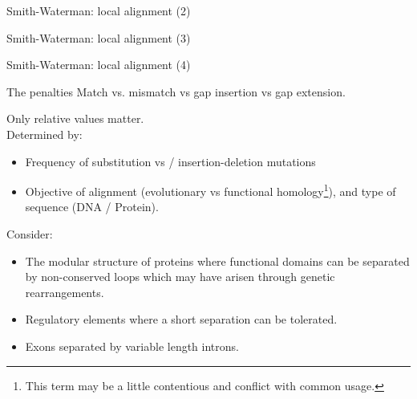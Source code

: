 \documentclass[pdf]{beamer}
\begin{document}
\begin{frame}{Smith-Waterman: local alignment (2)}
  \begin{figure}[ht]
    \begin{tikzpicture}[scale=0.5]
      
    \end{tikzpicture}
  \end{figure}
\end{frame}

\begin{frame}{Smith-Waterman: local alignment (3)}
  \begin{figure}[ht]
    \begin{tikzpicture}[scale=0.5]
      
    \end{tikzpicture}
  \end{figure}
\end{frame}

\begin{frame}{Smith-Waterman: local alignment (4)}
  \begin{figure}[ht]
    \begin{tikzpicture}[scale=0.5]
      
    \end{tikzpicture}
  \end{figure}
\end{frame}


\begin{frame}{The penalties}
  Match vs. mismatch vs gap insertion vs gap extension.
  
  Only relative values matter.\\ 
  Determined by:
  
  \begin{itemize}
  \item Frequency of substitution vs / insertion-deletion mutations
  \item Objective of alignment (evolutionary vs functional
    homology\footnote{This term may be a little contentious and conflict with
      common usage.}),
  and type of sequence (DNA / Protein). 
  \end{itemize}

  \pause
  Consider:
  \begin{itemize}
  \item The modular structure of proteins where functional domains
    can be separated by non-conserved loops which may have arisen
    through genetic rearrangements.
  \item Regulatory elements where a short separation can be tolerated.
  \item Exons separated by variable length introns.
  \end{itemize}

\end{frame}
\end{document}
